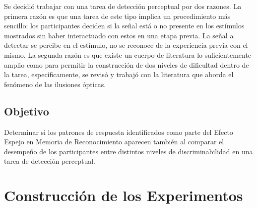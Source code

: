 Se decidió trabajar con una tarea de detección perceptual por dos razones. La primera razón es que una tarea de este tipo implica un procedimiento más sencillo: los participantes deciden si la señal está o no presente en los estímulos mostrados sin haber interactuado con estos en una etapa previa. La señal a detectar se percibe en el estímulo, no se reconoce de la experiencia previa con el mismo. La segunda razón es que existe un cuerpo de literatura lo suficientemente amplio como para permitir la construcción de dos niveles de dificultad dentro de la tarea, específicamente, se revisó y trabajó con la literatura que aborda el fenómeno de las ilusiones ópticas.\\

\subsection{Objetivo}

Determinar si los patrones de respuesta identificados como parte del Efecto Espejo en Memoria de Reconocimiento aparecen también al comparar el desempeño de los participantes entre distintos niveles de discriminabilidad en una tarea de detección perceptual.\\

\section{Construcción de los Experimentos}


